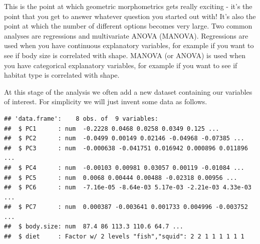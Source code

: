 \documentclass[]{book}
\newenvironment{Shaded}{\begin{snugshade}}{\end{snugshade}}
\newcommand{\KeywordTok}[1]{\textcolor[rgb]{0.13,0.29,0.53}{\textbf{{#1}}}}
\newcommand{\DataTypeTok}[1]{\textcolor[rgb]{0.13,0.29,0.53}{{#1}}}
\newcommand{\DecValTok}[1]{\textcolor[rgb]{0.00,0.00,0.81}{{#1}}}
\newcommand{\StringTok}[1]{\textcolor[rgb]{0.31,0.60,0.02}{{#1}}}
\newcommand{\CommentTok}[1]{\textcolor[rgb]{0.56,0.35,0.01}{\textit{{#1}}}}
\newcommand{\NormalTok}[1]{{#1}}
\theoremstyle{definition}
\theoremstyle{definition}
\theoremstyle{definition}
\theoremstyle{remark}
\begin{document}
This is the point at which geometric morphometrics gets really exciting
- it's the point that you get to answer whatever question you started
out with! It's also the point at which the number of different options
becomes very large. Two common analyses are regressions and multivariate
ANOVA (MANOVA). Regressions are used when you have continuous
explanatory variables, for example if you want to see if body size is
correlated with shape. MANOVA (or ANOVA) is used when you have
categorical explanatory variables, for example if you want to see if
habitat type is correlated with shape.

At this stage of the analysis we often add a new dataset containing our
variables of interest. For simplicity we will just invent some data as
follows.

\begin{Shaded}
\end{Shaded}

\begin{verbatim}
## 'data.frame':    8 obs. of  9 variables:
##  $ PC1      : num  -0.2228 0.0468 0.0258 0.0349 0.125 ...
##  $ PC2      : num  -0.0499 0.00149 0.02146 -0.04968 -0.07385 ...
##  $ PC3      : num  -0.000638 -0.041751 0.016942 0.000896 0.011896 ...
##  $ PC4      : num  -0.00103 0.00981 0.03057 0.00119 -0.01084 ...
##  $ PC5      : num  0.0068 0.00444 0.00488 -0.02318 0.00956 ...
##  $ PC6      : num  -7.16e-05 -8.64e-03 5.17e-03 -2.21e-03 4.33e-03 ...
##  $ PC7      : num  0.000387 -0.003641 0.001733 0.004996 -0.003752 ...
##  $ body.size: num  87.4 86 113.3 110.6 64.7 ...
##  $ diet     : Factor w/ 2 levels "fish","squid": 2 2 1 1 1 1 1 1
\end{verbatim}
\end{document}
